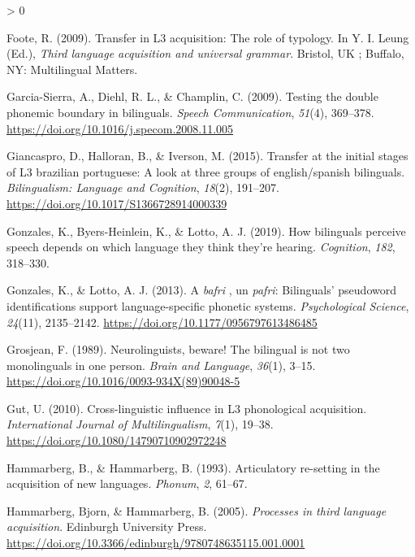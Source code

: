 \documentclass[
  english,
  man]{apa6}
\newlength{\cslhangindent}
\newenvironment{CSLReferences}[2] %
 {%
  \setlength{\parindent}{0pt}
  \ifodd #1 \everypar{\setlength{\hangindent}{\cslhangindent}}\ignorespaces\fi
  \ifnum #2 > 0
  \setlength{\parskip}{#2\baselineskip}
  \fi
 }%
 {}
\begin{document}
\begin{CSLReferences}{1}{0}
\leavevmode\hypertarget{ref-foote_transfer_2009}{}%
Foote, R. (2009). Transfer in L3 acquisition: The role of typology. In Y. I. Leung (Ed.), \emph{Third language acquisition and universal grammar}. Bristol, {UK} ; Buffalo, {NY}: Multilingual Matters.

\leavevmode\hypertarget{ref-garcia-sierra_testing_2009}{}%
Garcia-Sierra, A., Diehl, R. L., \& Champlin, C. (2009). Testing the double phonemic boundary in bilinguals. \emph{Speech Communication}, \emph{51}(4), 369--378. \url{https://doi.org/10.1016/j.specom.2008.11.005}

\leavevmode\hypertarget{ref-giancaspro_transfer_2015}{}%
Giancaspro, D., Halloran, B., \& Iverson, M. (2015). Transfer at the initial stages of L3 brazilian portuguese: A look at three groups of english/spanish bilinguals. \emph{Bilingualism: Language and Cognition}, \emph{18}(2), 191--207. \url{https://doi.org/10.1017/S1366728914000339}

\leavevmode\hypertarget{ref-gonzales_how_2019}{}%
Gonzales, K., Byers-Heinlein, K., \& Lotto, A. J. (2019). How bilinguals perceive speech depends on which language they think they're hearing. \emph{Cognition}, \emph{182}, 318--330.

\leavevmode\hypertarget{ref-gonzales_bafri_2013}{}%
Gonzales, K., \& Lotto, A. J. (2013). A \emph{bafri} , un \emph{pafri}: Bilinguals' pseudoword identifications support language-specific phonetic systems. \emph{Psychological Science}, \emph{24}(11), 2135--2142. \url{https://doi.org/10.1177/0956797613486485}

\leavevmode\hypertarget{ref-grosjean_neurolinguists_1989}{}%
Grosjean, F. (1989). Neurolinguists, beware! The bilingual is not two monolinguals in one person. \emph{Brain and Language}, \emph{36}(1), 3--15. \url{https://doi.org/10.1016/0093-934X(89)90048-5}

\leavevmode\hypertarget{ref-gut_cross-linguistic_2010}{}%
Gut, U. (2010). Cross-linguistic influence in L3 phonological acquisition. \emph{International Journal of Multilingualism}, \emph{7}(1), 19--38. \url{https://doi.org/10.1080/14790710902972248}

\leavevmode\hypertarget{ref-hammarberg_articulatory_1993}{}%
Hammarberg, B., \& Hammarberg, B. (1993). Articulatory re-setting in the acquisition of new languages. \emph{Phonum}, \emph{2}, 61--67.

\leavevmode\hypertarget{ref-hammarberg_processes_2005}{}%
Hammarberg, Bjorn, \& Hammarberg, B. (2005). \emph{Processes in third language acquisition}. Edinburgh University Press. \url{https://doi.org/10.3366/edinburgh/9780748635115.001.0001}


\end{CSLReferences}
\end{document}
